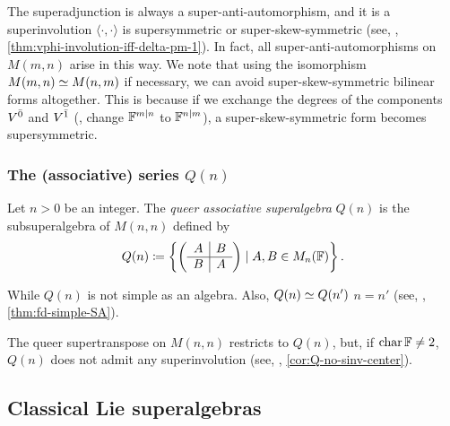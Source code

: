 The superadjunction is always a super-anti-automorphism, and it is a superinvolution \IFF $\langle \cdot, \cdot \rangle$ is supersymmetric or super-skew-symmetric (see, \eg, \cref{thm:vphi-involution-iff-delta-pm-1}). 
In fact, all super-anti-automorphisms on $M(m,n)$ arise in this way. 
We note that using the isomorphism $M(m,n) \simeq M(n,m)$ if necessary, we can avoid super-skew-symmetric bilinear forms altogether. 
This is because if we exchange the degrees of the components $V^{\bar0}$ and $V^{\bar1}$ (\ie, change $\mathbb{F}^{m|n}$ to $\mathbb{F}^{n|m}$), a super-skew-symmetric form becomes supersymmetric. 

\subsubsection{The (associative) series \texorpdfstring{$Q(n)$}{Q(n)}}

Let $n > 0$ be an integer. 
The \emph{queer associative superalgebra} $Q(n)$ is the subsuperalgebra of $M(n,n)$ defined by
\[
    Q(n) \coloneqq \left\{ \left(\begin{array}{c|c}
        A & B\\
        \hline
        B & A
    \end{array}\right)
    \mid A,B\in M_{n}(\mathbb{F})
    \right\}.
\]

While $Q(n)$ is not simple as an algebra. 
Also, $Q(n) \simeq Q(n')$ \IFF $n=n'$ (see, \eg, \cref{thm:fd-simple-SA}). 

The queer supertranspose on $M(n,n)$ restricts to $Q(n)$, but, if $\operatorname{char} \mathbb{F} \neq 2$,
$Q(n)$ does not admit any superinvolution (see, \eg, \cref{cor:Q-no-sinv-center}). 



\subsection{Classical Lie superalgebras}\label{sec:defi-classical-SA}

